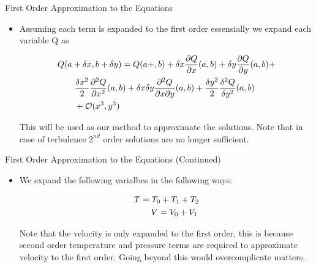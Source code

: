 \documentclass{beamer}
\begin{document}
\begin{frame}{First Order Approximation to the Equations}

\begin{itemize}

\item Assuming each term is expanded to the first order essensially we expand each variable Q as

\begin{equation}
\begin{split}
\MoveEqLeft 
Q(a + \delta x, b + \delta y) = Q(a+,b) + \delta x \frac{\partial Q}{\partial x}(a,b) + 
\delta y \frac{\partial Q}{\partial y}(a,b) + \\ 
& \frac{\delta x^2}{2} \frac{\partial^2 Q} {\partial x^2}(a,b) +   \delta x \delta y \frac{\partial ^ 2 Q}{\partial x \partial y}(a,b) +\frac{\delta y^2}{2} \frac{\delta^2 Q}{\delta y^2}(a,b) \\ 
&  + \mathcal{O}(x^3, y^3)
\end{split}
\end{equation}


This will be used as our method to approximate the solutions. Note that in case of terbulence $2^{nd}$ order solutions are no longer sufficient.
\end{itemize}

\end{frame}

\begin{frame} {First Order Approximation to the Equations (Continued)}

\begin{itemize}

\item We expand the following varialbes in the following ways:

\begin{equation*}
\begin{split}
\MoveEqLeft
T = T_0 + T_1 + T_2 \\
& V = V_0 + V_1
\end{split}
\end{equation*}

Note that the velocity is only expanded to the first order, this is because second order temperature and pressure terms are required to approximate velocity to the first order. Going beyond this would overcomplicate matters.

\end{itemize}

\end{frame}
\end{document}
